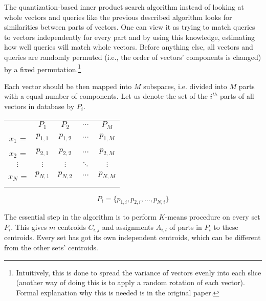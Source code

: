 The quantization-based inner product search algorithm \cite{quantization}
instead of looking at whole vectors and queries like the previous described algorithm
looks for similarities between parts of vectors.
One can view it as trying to match queries to vectors independently for every part and
by using this knowledge, estimating how well queries will match whole vectors.
Before anything else, all vectors and queries are randomly permuted 
(i.e., the order of vectors' components is changed)
by a fixed permutation.\footnote{
Intuitively, this is done to spread the variance of vectors evenly into each slice
(another way of doing this is to apply a random rotation of each vector). Formal
explanation why this is needed is in the original paper.
}

Each vector should be then mapped into $M$ subspaces, i.e. divided into $M$ parts with a equal number of components.
Let us denote the set of the $i^{th}$ parts of all vectors in database by $P_i$.
\begin{center}
\renewcommand{\arraystretch}{1.2}
\begin{tabular}{c|c|c|c|c|}
\multicolumn{1}{r}{} & \multicolumn{1}{c}{$P_{1}$} & \multicolumn{1}{c}{$P_{2}$}
& \multicolumn{1}{c}{$\cdots$} & \multicolumn{1}{c}{$P_{M}$} \\
\hhline{~----}
$x_1$ = & $p_{1,1}$ & $p_{1,2}$ & $\cdots$ & $p_{1,M}$ \\
\hhline{~----}
$x_2$ = & $p_{2,1}$ & $p_{2,2}$ & $\cdots$ & $p_{2,M}$ \\
\hhline{~----}
$\vdots$ & $\vdots$ & $\vdots$ & $\ddots$ & $\vdots$ \\
\hhline{~----}
$x_N$ = & $p_{N,1}$ & $p_{N,2}$ & $\cdots$ & $p_{N,M}$ \\
\hhline{~----}
\end{tabular}
\end{center}

\begin{equation*}
P_i = \{ p_{1,i}, p_{2,i}, \ldots, p_{N,i} \}
\end{equation*}

The essential step in the algorithm is to perform $K$-means procedure on every set $P_i$.
This gives $m$ centroids $C_{i,j}$ and assignments $A_{i,l}$ of parts in $P_i$ to these centroids.
Every set has got its own independent centroids, which can be different from the other sets' centroids.

